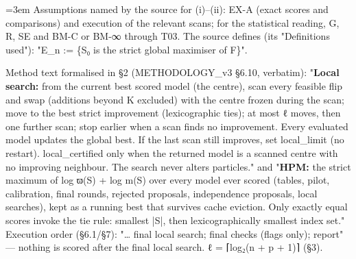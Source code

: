 \documentclass[11pt]{report}
\newenvironment{mdblock}{\begingroup\mdfont\raggedright\setlength{\parindent}{0pt}\setlength{\parskip}{0.55em}\emergencystretch=3em}{\par\endgroup}
\newcommand{\mdhead}[2]{\par\vspace{0.7em}\noindent{\bfseries\ifcase#1\or\large\or\normalsize\or\normalsize\or\small\or\small\or\small\fi #2}\par\nopagebreak\vspace{0.1em}}
\begin{document}
\begin{mdblock}
Assumptions named by the source for (i)–(ii): EX-A (exact scores and comparisons) and execution of the relevant scans; for the statistical reading, G, R, SE and BM-C or BM-∞ through T03. The source defines (its "Definitions used"): "E\_n := \{S₀ is the strict global maximiser of F\}".

Method text formalised in §2 (METHODOLOGY\_v3 §6.10, verbatim): "\textbf{Local search:} from the current best scored model (the centre), scan every feasible flip and swap (additions beyond K excluded) with the centre frozen during the scan; move to the best strict improvement (lexicographic ties); at most ℓ moves, then one further scan; stop earlier when a scan finds no improvement. Every evaluated model updates the global best. If the last scan still improves, set {\mdtt local\_\allowbreak{}limit} (no restart). {\mdtt local\_\allowbreak{}certified} only when the returned model is a scanned centre with no improving neighbour. The search never alters particles." and "\textbf{HPM:} the strict maximum of log ϖ(S) + log m(S) over every model ever scored (tables, pilot, calibration, final rounds, rejected proposals, independence proposals, local searches), kept as a running best that survives cache eviction. Only exactly equal scores invoke the tie rule: smallest |S|, then lexicographically smallest index set." Execution order (§6.1/§7): "… final local search; final checks (flags only); report" — nothing is scored after the final local search. ℓ = ⌈log₂(n + p + 1)⌉ (§3).

\mdhead{2}{1. Setting}


\end{mdblock}
\end{document}
